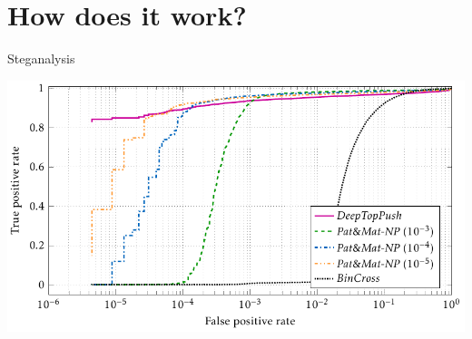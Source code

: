 \documentclass[10pt, aspectratio=169]{beamer}
\begin{document}
\section{How does it work?}


\begin{frame}{Steganalysis}
  \begin{center}
    \includegraphics[width=\linewidth, height=0.9\textheight, keepaspectratio]{
      ../images/stego_nsft5.pdf
    }
  \end{center}
\end{frame}
\end{document}
